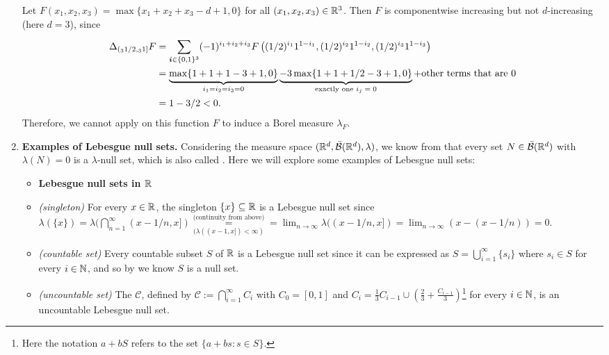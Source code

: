 \begin{enumerate}
Let \(F(x_1,x_2,x_3)=\max\{x_1+x_2+x_3-d+1,0\}\) for all \((x_1,x_2,x_3)\in\mathbb{R}^3\).
Then \(F\) is componentwise increasing but not \(d\)-increasing (here \(d=3\)),
since
\begin{align*}
\Delta_{({}_{3}1/2,{}_{3}1]}F&=\sum_{\bm{i}\in\{0,1\}^{3}}^{}(-1)^{i_1+i_2+i_3}
F\left((1/2)^{i_1}1^{1-i_1},(1/2)^{i_2}1^{1-i_2},(1/2)^{i_3}1^{1-i_3}\right) \\
&=\underbrace{\max\{1+1+1-3+1,0\}}_{i_1=i_2=i_3=0}
\underbrace{-3\max\{1+1+1/2-3+1,0\}}_{\text{exactly one \(i_j=0\)}}
+\text{other terms that are \(0\)} \\
&=1-3/2<0.
\end{align*}
Therefore, we cannot apply  on this function
\(F\) to induce a Borel measure \(\lambda_{F}\).
\item\label{it:lebesgue-null-sets-eg} \textbf{Examples of Lebesgue null sets.} Considering the measure space
\((\mathbb{R}^d,\bar{\mathcal{B}}(\mathbb{R}^d),\lambda)\), we know from
 that every set \(N\in\bar{\mathcal{B}}(\mathbb{R}^d)\) with
\(\lambda(N)=0\) is a \(\lambda\)-null set, which is also called . Here we will explore some examples of Lebesgue null sets:
\begin{itemize}
\item[] \textbf{Lebesgue null sets in \(\mathbb{R}\)}
\item \emph{(singleton)} For every \(x\in\mathbb{R}\), the singleton \(\{x\}\subseteq
\mathbb{R}\) is a Lebesgue null set since \(\lambda(\{x\})
=\lambda(\bigcap_{n=1}^{\infty}(x-1/n,x])
\underset{(\lambda((x-1,x])<\infty)}{\overset{\text{(continuity from above)}}{=}}
=\lim_{n\to\infty}\lambda((x-1/n,x])
=\lim_{n\to\infty}(x-(x-1/n))
=0
\).
\item \emph{(countable set)} Every countable subset \(S\) of \(\mathbb{R}\) is a
Lebesgue null set since it can be expressed as
\(S=\bigcup_{i=1}^{\infty}\{s_i\}\) where \(s_i\in S\) for every \(i\in\mathbb{N}\),
and so by  we know \(S\) is a null set.
\item \emph{(uncountable set)} The  \(\mathcal{C}\), defined
by \(\mathcal{C}:=\bigcap_{i=1}^{\infty}C_i\) with \(C_0=[0,1]\) and
\(C_i=\frac{1}{3}C_{i-1}\cup\left(\frac{2}{3}+\frac{C_{i-1}}{3}\right)\)\footnote{
Here the notation \(a+bS\) refers to the set \(\{a+bs:s\in S\}\).} for every
\(i\in\mathbb{N}\), is an uncountable Lebesgue null set.
\begin{center}
\end{center}
\end{itemize}
\end{enumerate}
